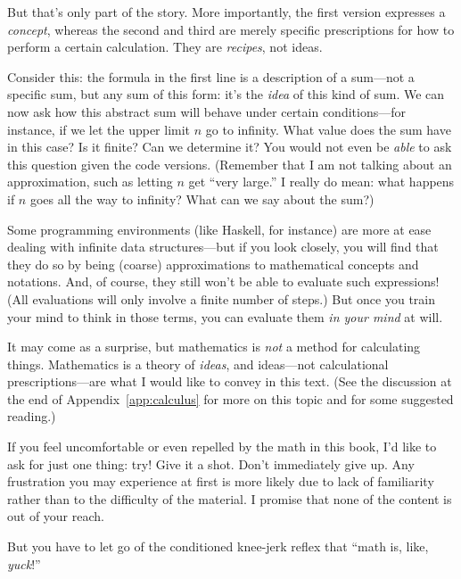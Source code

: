 %

But that's only part of the story.  More importantly, the first
version expresses a \emph{concept}, whereas the second and third are
merely specific prescriptions for how to perform a certain calculation.
They are \emph{recipes}, not ideas.

Consider this: the formula in the first line is a description of a
sum---not a specific sum, but any sum of this form: it's the
\emph{idea} of this kind of sum. We can now ask how this abstract sum
will behave under certain conditions---for instance, if we let the
upper limit $n$ go to infinity. What value does the sum have in this
case?  Is it finite? Can we determine it? You would not even be
\emph{able} to ask this question given the code versions. (Remember
that I am not talking about an approximation, such as letting $n$ get
``very large.'' I really do mean: what happens if $n$ goes all the way
to infinity? What can we say about the sum?)

Some programming environments (like Haskell, for instance) are more at
ease dealing with infinite data structures---but if you look
closely, you will find that they do so by being (coarse)
approximations to mathematical concepts and notations. And, of course,
they still won't be able to evaluate such expressions! (All
evaluations will only involve a finite number of steps.)  But once you
train your mind to think in those terms, you can evaluate them
\emph{in your mind} at will.

It may come as a surprise, but mathematics is \emph{not} a method for
calculating things. Mathematics is a theory of \emph{ideas}, and
ideas---not calculational prescriptions---are what I would like to
convey in this text. (See the discussion at the end of Appendix~\ref{app:calculus} for more on this topic and
for some suggested reading.)

If you feel uncomfortable or even repelled by the math in this book,
I'd like to ask for just one thing: try! Give it a shot. Don't
immediately give up. Any frustration you may experience at first is
more likely due to lack of familiarity rather than to the difficulty
of the material. I promise that none of the content is out of your
reach.

But you have to let go of the conditioned knee-jerk reflex that ``math
is, like, \emph{yuck}!''

